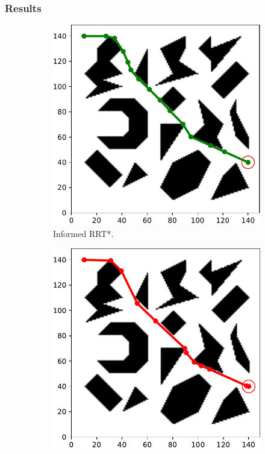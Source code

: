 \documentclass{beamer}
\begin{document}
\begin{frame}
	\frametitle{Results}	
	\begin{figure}[!ht]
		\centering 
		\begin{subfigure}[t]{0.32\textwidth}
		  \includegraphics[width=\textwidth]{figChap5/Maze_clutter_final_solution_InformedRRTstar.pdf}  
		  \caption{Informed RRT*.}
		\end{subfigure}  
		\begin{subfigure}[t]{0.32\textwidth}
		  \includegraphics[width=\textwidth]{figChap5/Maze_clutter_final_solution_RRTsharp.pdf}  

\end{subfigure}
\end{figure}
\end{frame}
\end{document}
